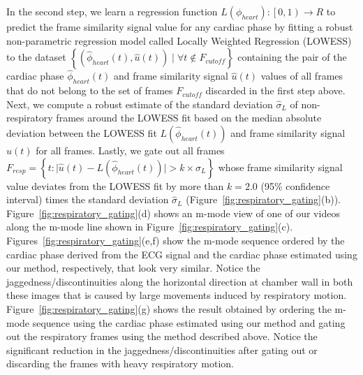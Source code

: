 \documentclass[journal]{IEEEtran}
\begin{document}
In the second step, we learn a regression function $L(\phi_{heart}) : \left [  0, 1\right ) \to R$ to predict the frame similarity signal value for any cardiac phase by fitting a robust non-parametric regression model called Locally Weighted Regression (LOWESS)~\cite{Cleveland1988} to the dataset $\left \{ \left(\hat{\phi}_{heart}(t), \hat{u}(t) \right) \mid \forall t \notin F_{cutoff}  \right \}$ containing the pair of the cardiac phase $\hat{\phi}_{heart}(t)$ and frame similarity signal $\hat{u}(t)$  values of all frames that do not belong to the set of frames $F_{cutoff}$ discarded in the first step above. Next, we compute a robust estimate of the standard deviation $\hat{\sigma}_{L}$ of non-respiratory frames around the LOWESS fit based on the median absolute deviation between the LOWESS fit $L( \hat{\phi}_{heart}(t) )$ and frame similarity signal $\hat{u}(t)$ for all frames. Lastly, we gate out all frames $F_{resp} = \left \{ t : \lvert \hat{u}(t) - L( \hat{\phi}_{heart}(t) ) \rvert   > k \times \hat{\sigma}_{L}  \right \}$ whose frame similarity signal value deviates from the LOWESS fit by more than $k = 2.0$ (95\% confidence interval) times the standard deviation $\hat{\sigma}_{L}$ (Figure~\ref{fig:respiratory_gating}(b)). Figure~\ref{fig:respiratory_gating}(d) shows an m-mode view of one of our videos along the m-mode line shown in Figure~\ref{fig:respiratory_gating}(c). Figures~\ref{fig:respiratory_gating}(e,f) show the m-mode sequence ordered by the cardiac phase derived from the ECG signal and the cardiac phase estimated using our method, respectively, that look very similar. Notice the jaggedness/discontinuities along the horizontal direction at chamber wall in both these images that is caused by large movements induced by respiratory motion. Figure~\ref{fig:respiratory_gating}(g) shows the result obtained by ordering the m-mode sequence using the cardiac phase estimated using our method and gating out the respiratory frames using the method described above. Notice the significant reduction in the jaggedness/discontinuities after gating out or discarding the frames with heavy respiratory motion.
%
\end{document}
